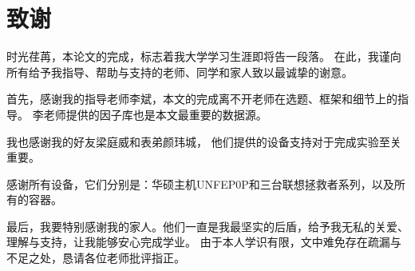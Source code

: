 
\clearpage
{}
{}

\chapter*{致谢}
时光荏苒，本论文的完成，标志着我大学学习生涯即将告一段落。
在此，我谨向所有给予我指导、帮助与支持的老师、同学和家人致以最诚挚的谢意。

首先，感谢我的指导老师李斌，本文的完成离不开老师在选题、框架和细节上的指导。
李老师提供的因子库也是本文最重要的数据源。

我也感谢我的好友梁庭威和表弟颜玮城，
他们提供的设备支持对于完成实验至关重要。

感谢所有设备，它们分别是：华硕主机UNFEP0P和三台联想拯救者系列，以及所有的容器。

最后，我要特别感谢我的家人。他们一直是我最坚实的后盾，给予我无私的关爱、理解与支持，让我能够安心完成学业。
由于本人学识有限，文中难免存在疏漏与不足之处，恳请各位老师批评指正。
